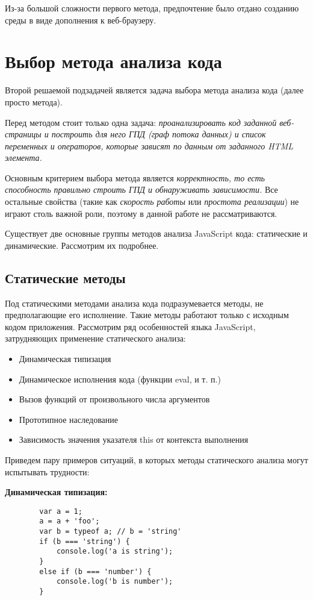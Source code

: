 	Из-за большой сложности первого метода, предпочтение было отдано созданию среды в виде дополнения к веб-браузеру.

\section{Выбор метода анализа кода}

Второй решаемой подзадачей является задача выбора метода анализа кода (далее просто метода). 

\bigskip
Перед методом стоит только одна задача: \textit{проанализировать код заданной веб-страницы и построить для него ГПД (граф потока данных) и список переменных и операторов, которые зависят по данным от заданного HTML элемента.}

\bigskip
Основным критерием выбора метода является \textit{корректность, то есть способность правильно строить ГПД и обнаруживать зависимости.} Все остальные свойства (такие как \textit{скорость работы} или \textit{простота реализации}) не играют столь важной роли, поэтому в данной работе не рассматриваются.

\bigskip
Существует две основные группы методов анализа JavaScript кода: статические и динамические. Рассмотрим их подробнее.

\subsection{Статические методы}
	Под статическими методами анализа кода подразумевается методы, не предполагающие его исполнение. Такие методы работают только с исходным кодом приложения. Рассмотрим ряд особенностей языка JavaScript, затрудняющих применение статического анализа:

	\bigskip
	\begin{itemize}
		\item Динамическая типизация
		\item Динамическое исполнения кода (функции eval, и т. п.)
		\item Вызов функций от произвольного числа аргументов
		\item Прототипное наследование
		\item Зависимость значения указателя this от контекста выполнения
	\end{itemize}
	\bigskip

	Приведем пару примеров ситуаций, в которых методы статического анализа могут испытывать трудности:


	\bigskip
	\textbf{Динамическая типизация:}
	\begin{lstlisting}
		var a = 1;
		a = a + 'foo';
		var b = typeof a; // b = 'string'
		if (b === 'string') {
			console.log('a is string');
		}
		else if (b === 'number') {
			console.log('b is number');
		}
	\end{lstlisting}

